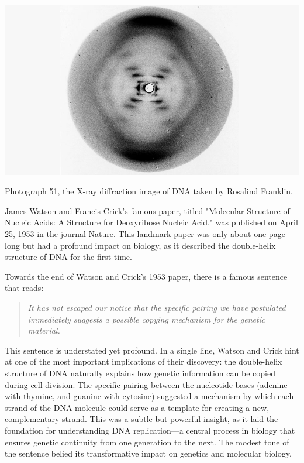 \begin{marginfigure}
    \includegraphics{figs/history/photograph-51.jpeg}
    \caption[6pt]{Photograph 51, the X-ray diffraction image of DNA taken by Rosalind Franklin.}
    \label{fig:photograph-51}
\end{marginfigure}

James Watson and Francis Crick's famous paper, titled "Molecular Structure of Nucleic Acids: A Structure for Deoxyribose Nucleic Acid," was published on April 25, 1953 in the journal Nature. This landmark paper was only about one page long but had a profound impact on biology, as it described the double-helix structure of DNA for the first time.

Towards the end of Watson and Crick’s 1953 paper, there is a famous sentence that reads:
\begin{quote}
    \textit{It has not escaped our notice that the specific pairing we have postulated immediately suggests a possible copying mechanism for the genetic material.}
\end{quote}
This sentence is understated yet profound. In a single line, Watson and Crick hint at one of the most important implications of their discovery: the double-helix structure of DNA naturally explains how genetic information can be copied during cell division. The specific pairing between the nucleotide bases (adenine with thymine, and guanine with cytosine) suggested a mechanism by which each strand of the DNA molecule could serve as a template for creating a new, complementary strand. This was a subtle but powerful insight, as it laid the foundation for understanding DNA replication—a central process in biology that ensures genetic continuity from one generation to the next. The modest tone of the sentence belied its transformative impact on genetics and molecular biology.


